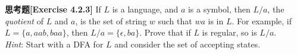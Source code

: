 \textbf{思考题[Exercise 4.2.3]} If $L$ is a language, and $a$ is a symbol, 
then $L/a$, the \textit{quotient} of $L$ and $a$, is the set of string $w$ 
such that $wa$ is in $L$. For example, if $L = \{a,aab,baa\}$, then 
$L/a = \{\epsilon,ba\}$. Prove that if $L$ is regular, so is $L/a$.\\
\textit{Hint}: Start with a DFA for $L$ and consider the set of accepting states.
